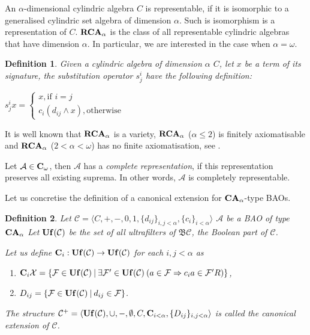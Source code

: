 \documentclass[a4paper]{article}
\theoremstyle{defin}
\newtheorem{defin}{Definition}
\theoremstyle{theorem}
\theoremstyle{prop}
\theoremstyle{lemma}
\theoremstyle{fact}
\theoremstyle{ex}
\theoremstyle{col}
\begin{document}
An $\alpha$-dimensional cylindric algebra $C$ is representable, if it is isomorphic to a generalised cylindric set algebra
of dimension $\alpha$. Such is isomorphism is a representation of $C$. ${\bf RCA}_{\alpha}$ is the class of all representable cylindric algebras that have dimension $\alpha$. In particular, we are interested in the case when $\alpha = \omega$.

\begin{defin}
  Given a cylindric algebra of dimension $\alpha$ $C$, let $x$ be a term of its signature, the substitution operator $s^{i}_{j}$ have the following definition:
  \begin{center}
  $s^{i}_{j} x = \begin{cases} x, \text{if } i = j \\ c_i (d_{ij} \land x), \text{otherwise} \end{cases}$
  \end{center}
\end{defin}

It is well known that ${\bf RCA}_{\alpha}$ is a variety, ${\bf RCA}_{\alpha}$ ($\alpha \leq 2$) is finitely axiomatisable and ${\bf RCA}_{\alpha}$ ($2 < \alpha < \omega$) has no finite axiomatisation, see \cite{Henkin1988-HENCAP-4}.

Let $\mathcal{A} \in {\bf C}_{\omega}$, then $\mathcal{A}$ has a \emph{complete representation}, if this representation preserves all existing suprema. In other words, $\mathcal{A}$ is completely representable.

Let us concretise the definition of a canonical extension for ${\bf CA}_{\alpha}$-type BAOs.

\begin{defin}
  Let $\mathcal{C} = \langle C, +, -, 0, 1, \{ d_{ij} \}_{i, j < \alpha}, \{c_i\}_{i < \alpha} \rangle$ $\mathcal{A}$ be a BAO of type ${\bf CA}_{\alpha}$ Let ${\bf Uf}(\mathcal{C})$ be the set of all ultrafilters of $\mathfrak{B}\mathcal{C}$, the Boolean part of $\mathcal{C}$.

  Let us define ${\bf C}_{i} : {\bf Uf}(\mathcal{C}) \to {\bf Uf}(\mathcal{C})$ for each $i, j < \alpha$ as
  \begin{enumerate}
\item ${\bf C}_{i} \mathcal{X} = \{ \mathcal{F} \in {\bf Uf}(\mathcal{C}) \: | \: \exists \mathcal{F}' \in {\bf Uf}(\mathcal{C}) \: (a \in \mathcal{F} \Rightarrow c_i a \in \mathcal{F}' R)\}$,
\item $D_{ij} = \{ \mathcal{F} \in {\bf Uf}(\mathcal{C}) \: | \: d_{ij} \in \mathcal{F} \}$.
  \end{enumerate}
  The structure $\mathcal{C}^{+} = \langle  {\bf Uf}(\mathcal{C}), \cup, -, \emptyset, C, {\bf C}_{i < \alpha}, \{D_{ij}\}_{i, j < \alpha} \rangle$ is called the canonical extension of $\mathcal{C}$.
\end{defin}
\end{document}
